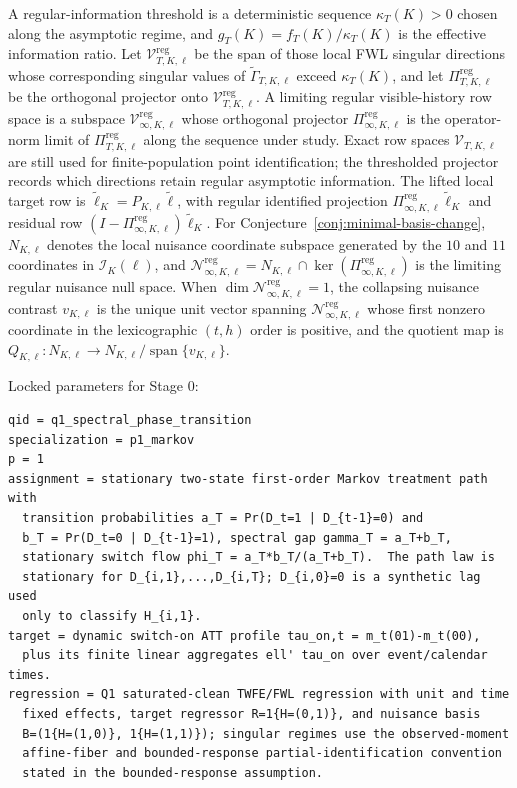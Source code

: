 \documentclass[11pt]{article}
\theoremstyle{definition}
\theoremstyle{plain}
\theoremstyle{remark}
\begin{document}
A regular-information threshold is a deterministic sequence \(\kappa_T(K)>0\) chosen along the asymptotic regime, and \(g_T(K)=f_T(K)/\kappa_T(K)\) is the effective information ratio.
Let \(\mathcal V^{\mathrm{reg}}_{T,K,\ell}\) be the span of those local FWL singular directions whose corresponding singular values of \(\widetilde \Gamma_{T,K,\ell}\) exceed \(\kappa_T(K)\), and let \(\Pi^{\mathrm{reg}}_{T,K,\ell}\) be the orthogonal projector onto \(\mathcal V^{\mathrm{reg}}_{T,K,\ell}\).
A limiting regular visible-history row space is a subspace \(\mathcal V^{\mathrm{reg}}_{\infty,K,\ell}\) whose orthogonal projector \(\Pi^{\mathrm{reg}}_{\infty,K,\ell}\) is the operator-norm limit of \(\Pi^{\mathrm{reg}}_{T,K,\ell}\) along the sequence under study.
Exact row spaces \(\mathcal V_{T,K,\ell}\) are still used for finite-population point identification; the thresholded projector records which directions retain regular asymptotic information.
The lifted local target row is \(\widetilde\ell_{K}=P_{K,\ell}\widetilde\ell\), with regular identified projection \(\Pi^{\mathrm{reg}}_{\infty,K,\ell}\widetilde\ell_K\) and residual row \((I-\Pi^{\mathrm{reg}}_{\infty,K,\ell})\widetilde\ell_K\).
For Conjecture~\ref{conj:minimal-basis-change}, \(N_{K,\ell}\) denotes the local nuisance coordinate subspace generated by the \(10\) and \(11\) coordinates in \(\mathcal I_K(\ell)\), and \(\mathcal N^{\mathrm{reg}}_{\infty,K,\ell}=N_{K,\ell}\cap\ker(\Pi^{\mathrm{reg}}_{\infty,K,\ell})\) is the limiting regular nuisance null space.
When \(\dim \mathcal N^{\mathrm{reg}}_{\infty,K,\ell}=1\), the collapsing nuisance contrast \(v_{K,\ell}\) is the unique unit vector spanning \(\mathcal N^{\mathrm{reg}}_{\infty,K,\ell}\) whose first nonzero coordinate in the lexicographic \((t,h)\) order is positive, and the quotient map is \(Q_{K,\ell}:N_{K,\ell}\to N_{K,\ell}/\operatorname{span}\{v_{K,\ell}\}\).

Locked parameters for Stage 0:
\begin{verbatim}
qid = q1_spectral_phase_transition
specialization = p1_markov
p = 1
assignment = stationary two-state first-order Markov treatment path with
  transition probabilities a_T = Pr(D_t=1 | D_{t-1}=0) and
  b_T = Pr(D_t=0 | D_{t-1}=1), spectral gap gamma_T = a_T+b_T,
  stationary switch flow phi_T = a_T*b_T/(a_T+b_T).  The path law is
  stationary for D_{i,1},...,D_{i,T}; D_{i,0}=0 is a synthetic lag used
  only to classify H_{i,1}.
target = dynamic switch-on ATT profile tau_on,t = m_t(01)-m_t(00),
  plus its finite linear aggregates ell' tau_on over event/calendar times.
regression = Q1 saturated-clean TWFE/FWL regression with unit and time
  fixed effects, target regressor R=1{H=(0,1)}, and nuisance basis
  B=(1{H=(1,0)}, 1{H=(1,1)}); singular regimes use the observed-moment
  affine-fiber and bounded-response partial-identification convention
  stated in the bounded-response assumption.
\end{verbatim}
\end{document}
